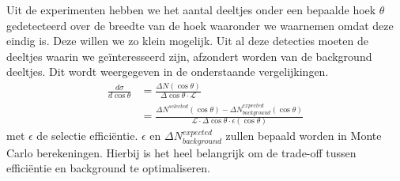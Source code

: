 \documentclass[../main.tex]{subfiles}
\begin{document}
Uit de experimenten hebben we het aantal deeltjes onder een bepaalde hoek $\theta$ gedetecteerd over de breedte van de hoek waaronder we waarnemen omdat deze eindig is. Deze willen we zo klein mogelijk. Uit al deze detecties moeten de deeltjes waarin we geïnteresseerd zijn, afzondert worden van de background deeltjes. Dit wordt weergegeven in de onderstaande vergelijkingen.
\begin{equation}
    \begin{aligned}
        \label{eq:measure_cros_sec}
        \frac{d\sigma}{d\cos\theta} &= \frac{\Delta N(\cos\theta)}{\Delta \cos\theta\cdot\mathcal{L}} \\
                                    &= \frac{\Delta N^{selected}(\cos\theta)-\Delta N_{background}^{expected}(\cos\theta)}{\mathcal{L}\cdot\Delta\cos\theta\cdot\epsilon(\cos\theta)} 
    \end{aligned}
\end{equation}
met $\epsilon$ de selectie efficiëntie. $\epsilon$ en $\Delta N_{background}^{expected}$ zullen bepaald worden in Monte Carlo berekeningen. Hierbij is het heel belangrijk om de trade-off tussen efficiëntie en background te optimaliseren.
\end{document}
